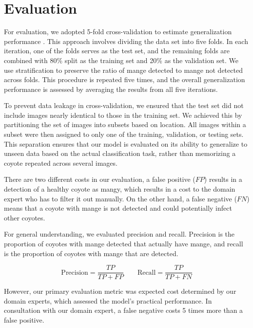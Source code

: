 \documentclass{article}
\begin{document}
\section{Evaluation} \label{sec:evaluation}

For evaluation, we adopted 5-fold cross-validation to estimate generalization performance \cite{Berrar2019, Schaffer1993}.
This approach involves dividing the data set into five folds.
In each iteration, one of the folds serves as the test set, and the remaining folds are combined with 80\% split as the training set and 20\% as the validation set. We use stratification to preserve the ratio of mange detected to mange not detected across folds. This procedure is repeated five times, and the overall generalization performance is assessed by averaging the results from all five iterations.

To prevent data leakage in cross-validation, we ensured that the test set did not include images nearly identical to those in the training set. We achieved this by partitioning the set of images into subsets based on location. All images within a subset were then assigned to only one of the training, validation, or testing sets. This separation ensures that our model is evaluated on its ability to generalize to unseen data based on the actual classification task, rather than memorizing a coyote repeated across several images.

There are two different costs in our evaluation, a false positive ($FP$) results in a detection of a healthy coyote as mangy, which results in a cost to the domain expert who has to filter it out manually. On the other hand, a false negative ($FN$) means that a coyote with mange is not detected and could potentially infect other coyotes.

For general understanding, we evaluated precision and recall. Precision is the proportion of coyotes with mange detected that actually have mange, and recall is the proportion of coyotes with mange that are detected.

\begin{equation}
  \text{Precision} = \frac{TP}{TP+FP} \qquad \text{Recall} = \frac{TP}{TP+FN}
\end{equation}

However, our primary evaluation metric was expected cost determined by our domain experts, which assessed the model's practical performance. In consultation with our domain expert, a false negative costs 5 times more than a false positive.
\end{document}
